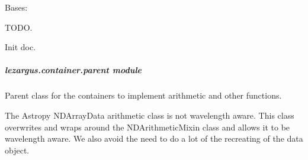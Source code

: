 \documentclass[letterpaper,11pt,english]{sphinxmanual}
\begin{document}
\begin{savenotes}\begin{fulllineitems}
\label{\detokenize{code/lezargus.container.mosaic:lezargus.container.mosaic.LezargusMosaic}}
\pysigstartsignatures
{}
\pysigstopsignatures
\sphinxAtStartPar
Bases: 

\sphinxAtStartPar
TODO.

\begin{savenotes}\begin{fulllineitems}
\label{\detokenize{code/lezargus.container.mosaic:lezargus.container.mosaic.LezargusMosaic.__init__}}
\pysigstartsignatures
{}
\pysigstopsignatures
\sphinxAtStartPar
Init doc.

\end{fulllineitems}\end{savenotes}


\end{fulllineitems}\end{savenotes}


\sphinxstepscope


\subparagraph{lezargus.container.parent module}
\label{\detokenize{code/lezargus.container.parent:module-lezargus.container.parent}}\label{\detokenize{code/lezargus.container.parent:lezargus-container-parent-module}}\label{\detokenize{code/lezargus.container.parent::doc}}
\sphinxAtStartPar
Parent class for the containers to implement arithmetic and other functions.

\sphinxAtStartPar
The Astropy NDArrayData arithmetic class is not wavelength aware. This class
overwrites and wraps around the NDArithmeticMixin class and allows it to be
wavelength aware. We also avoid the need to do a lot of the recreating of the
data object.
\end{document}
